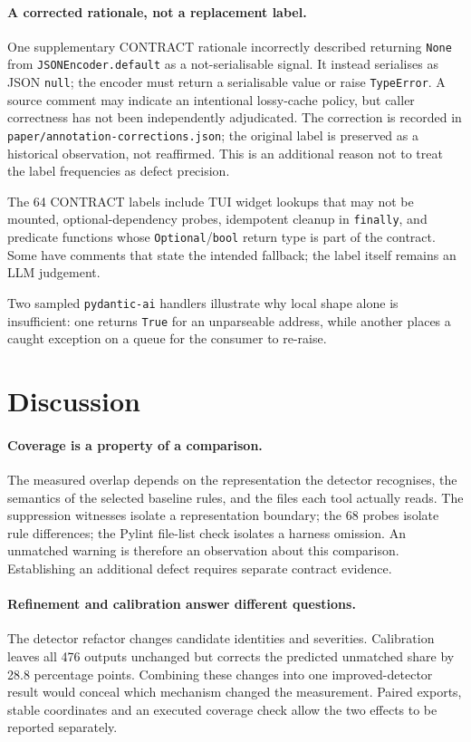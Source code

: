 \documentclass[10pt,a4paper]{article}
\begin{document}
\paragraph{A corrected rationale, not a replacement label.}
One supplementary CONTRACT rationale incorrectly described returning
\texttt{None} from \texttt{JSONEncoder.default} as a not-serialisable signal.
It instead serialises as JSON \texttt{null}; the encoder must return a
serialisable value or raise \texttt{TypeError}. A source comment may indicate
an intentional lossy-cache policy, but caller correctness has not been
independently adjudicated. The correction is recorded in
\texttt{paper/annotation-corrections.json}; the original label is preserved
as a historical observation, not reaffirmed. This is an additional reason
not to treat the label frequencies as defect precision.

The 64 CONTRACT labels include TUI widget lookups that may not be mounted,
optional-dependency probes, idempotent cleanup in \texttt{finally}, and
predicate functions whose \texttt{Optional}/\texttt{bool} return type is part
of the contract. Some have comments that state the intended fallback; the label
itself remains an LLM judgement.

Two sampled \texttt{pydantic-ai} handlers illustrate why local shape alone is
insufficient: one returns \texttt{True} for an unparseable address, while
another places a caught exception on a queue for the consumer to re-raise.

\section{Discussion}
\label{sec:discussion}

\paragraph{Coverage is a property of a comparison.}
The measured overlap depends on the representation the detector recognises,
the semantics of the selected baseline rules, and the files each tool
actually reads. The suppression witnesses isolate a representation boundary;
the 68 probes isolate rule differences; the Pylint file-list check isolates
a harness omission. An unmatched warning is therefore an observation about
this comparison. Establishing an additional defect requires separate
contract evidence.

\paragraph{Refinement and calibration answer different questions.}
The detector refactor changes candidate identities and severities.
Calibration leaves all 476 outputs unchanged but corrects the predicted
unmatched share by 28.8 percentage points. Combining these changes into one
improved-detector result would conceal which mechanism changed the
measurement. Paired exports, stable coordinates and an executed coverage
check allow the two effects to be reported separately.
\end{document}
